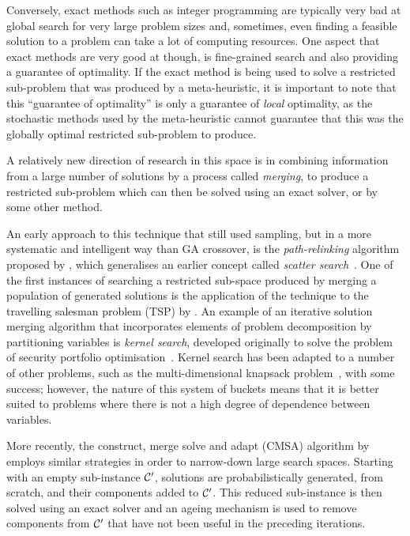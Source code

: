 \documentclass[preprint]{elsarticle}
\begin{document}
Conversely, exact methods such as integer programming are typically very bad at global search for very large problem sizes and, sometimes, even finding a feasible solution to a problem can take a lot of computing resources. One aspect that exact methods are very good at though, is fine-grained search and also providing a guarantee of optimality. If the exact method is being used to solve a restricted sub-problem that was produced by a meta-heuristic, it is important to note that this ``guarantee of optimality'' is only a guarantee of \emph{local} optimality, as the stochastic methods used by the meta-heuristic cannot guarantee that this was the globally optimal restricted sub-problem to produce.

A relatively new direction of research in this space is in combining information from a large number of solutions by a process called \emph{merging}, to produce a restricted sub-problem which can then be solved using an exact solver, or by some other method. 

An early approach to this technique that still used sampling, but in a more systematic and intelligent way than GA crossover, is the \emph{path-relinking} algorithm proposed by \citet{path-relinking}, which generalises an earlier concept called \emph{scatter search}~\citep{scatter-search}. One of the first instances of searching a restricted sub-space produced by merging a population of generated solutions is the application of the technique to the travelling salesman problem (TSP) by \citet{merge-tsp}. An example of an iterative solution merging algorithm that incorporates elements of problem decomposition by partitioning variables is \emph{kernel search}, developed originally to solve the problem of security portfolio optimisation~\citep{kernel1}. Kernel search has been adapted to a number of other problems, such as the multi-dimensional knapsack problem~\citep{kernel2}, with some success; however, the nature of this system of buckets means that it is better suited to problems where there is not a high degree of dependence between variables.

More recently, the construct, merge solve and adapt (CMSA) algorithm by \citet{cmsa} employs similar strategies in order to narrow-down large search spaces. Starting with an empty sub-instance $\S{C}^\prime$, solutions are probabilistically generated, from scratch, and their components added to $\S{C}^\prime$. This reduced sub-instance is then solved using an exact solver and an ageing mechanism is used to remove components from $\S{C}^\prime$ that have not been useful in the preceding iterations.
\end{document}
